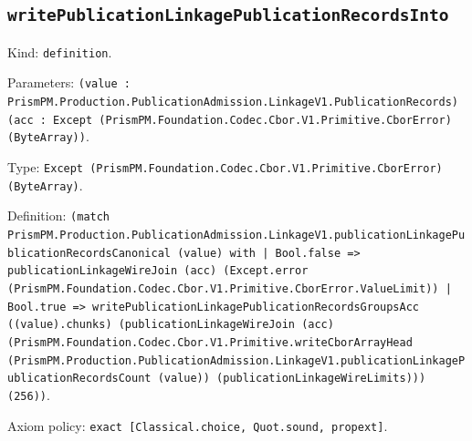 \documentclass[11pt]{article}
\begin{document}
\subsection*{\texttt{writePublicationLinkagePublicationRecordsInto}}
\noindent Kind: \texttt{definition}.\par
\noindent Parameters: \texttt{(value : PrismPM.Production.PublicationAdmission.LinkageV1.PublicationRecords) (acc : Except (PrismPM.Foundation.Codec.Cbor.V1.Primitive.CborError) (ByteArray))}.\par
\noindent Type: \texttt{Except (PrismPM.Foundation.Codec.Cbor.V1.Primitive.CborError) (ByteArray)}.\par
\noindent Definition: \texttt{(match PrismPM.Production.PublicationAdmission.LinkageV1.publicationLinkagePublicationRecordsCanonical (value) with | Bool.false => publicationLinkageWireJoin (acc) (Except.error (PrismPM.Foundation.Codec.Cbor.V1.Primitive.CborError.ValueLimit)) | Bool.true => writePublicationLinkagePublicationRecordsGroupsAcc ((value).chunks) (publicationLinkageWireJoin (acc) (PrismPM.Foundation.Codec.Cbor.V1.Primitive.writeCborArrayHead (PrismPM.Production.PublicationAdmission.LinkageV1.publicationLinkagePublicationRecordsCount (value)) (publicationLinkageWireLimits))) (256))}.\par
\noindent Axiom policy: \texttt{exact [Classical.choice, Quot.sound, propext]}.\par
\end{document}
